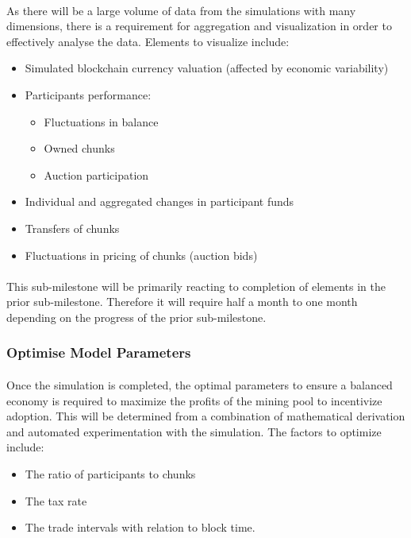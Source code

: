 \paragraph{} As there will be a large volume of data from the simulations with many dimensions, there is a requirement for aggregation and visualization in order to effectively analyse the data. Elements to visualize include:

\begin{itemize}
  \item Simulated blockchain currency valuation (affected by economic variability)
  \item Participants performance:
    \begin{itemize}
      \item Fluctuations in balance
      \item Owned chunks
      \item Auction participation
    \end{itemize}
  \item Individual and aggregated changes in participant funds
  \item Transfers of chunks
  \item Fluctuations in pricing of chunks (auction bids)
\end{itemize}

\paragraph{} This sub-milestone will be primarily reacting to completion of elements in the prior sub-milestone. Therefore it will require half a month to one month depending on the progress of the prior sub-milestone.

\subsubsection{Optimise Model Parameters}

\paragraph{} Once the simulation is completed, the optimal parameters to ensure a balanced economy is required to maximize the profits of the mining pool to incentivize adoption. This will be determined from a combination of mathematical derivation and automated experimentation with the simulation. The factors to optimize include: 

\begin{itemize}
  \item The ratio of participants to chunks
  \item The tax rate
  \item The trade intervals with relation to block time.
\end{itemize}

